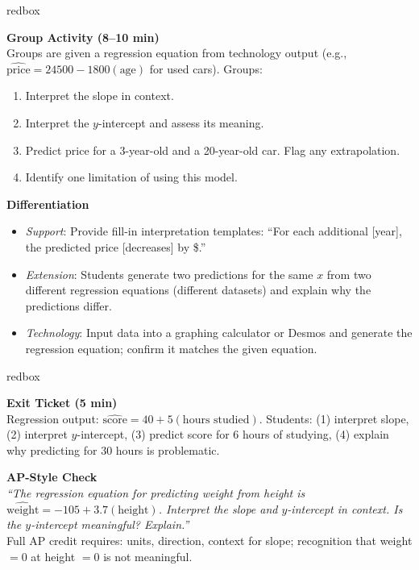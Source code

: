 \documentclass[10pt]{article}
\begin{document}
\begin{skillbox}{redbox}
\begin{minipage}[t]{0.48\linewidth}
    \textbf{Group Activity (8--10 min)}\\
    Groups are given a regression equation from technology output (e.g., $\widehat{\text{price}} = 24500 - 1800(\text{age})$ for used cars). Groups:
    \begin{enumerate}
        \item Interpret the slope in context.
        \item Interpret the $y$-intercept and assess its meaning.
        \item Predict price for a 3-year-old and a 20-year-old car. Flag any extrapolation.
        \item Identify one limitation of using this model.
    \end{enumerate}
\end{minipage}
\hfill
\begin{minipage}[t]{0.48\linewidth}
    \textbf{Differentiation}
    \begin{itemize}
        \item \textit{Support}: Provide fill-in interpretation templates: ``For each additional [year], the predicted price [decreases] by \$\underline{\hspace{1cm}}.''
        \item \textit{Extension}: Students generate two predictions for the same $x$ from two different regression equations (different datasets) and explain why the predictions differ.
        \item \textit{Technology}: Input data into a graphing calculator or Desmos and generate the regression equation; confirm it matches the given equation.
    \end{itemize}
\end{minipage}
\end{skillbox}

\begin{skillbox}{redbox}
\begin{minipage}[t]{0.48\linewidth}
    \textbf{Exit Ticket (5 min)}\\
    Regression output: $\widehat{\text{score}} = 40 + 5(\text{hours studied})$. Students: (1) interpret slope, (2) interpret $y$-intercept, (3) predict score for 6 hours of studying, (4) explain why predicting for 30 hours is problematic.
\end{minipage}
\hfill
\begin{minipage}[t]{0.48\linewidth}
    \textbf{AP-Style Check}\\
    \textit{``The regression equation for predicting weight from height is $\widehat{\text{weight}} = -105 + 3.7(\text{height})$. Interpret the slope and $y$-intercept in context. Is the $y$-intercept meaningful? Explain.''}\\[4pt]
    Full AP credit requires: units, direction, context for slope; recognition that weight $= 0$ at height $= 0$ is not meaningful.
\end{minipage}
\end{skillbox}
\end{document}
